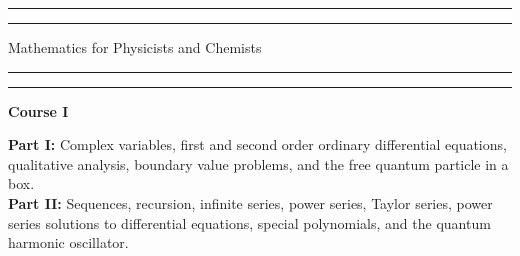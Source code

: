 


\begin{titlepage} %

	\centering %

	\scshape %

	\vspace*{\baselineskip} %


	\rule{\textwidth}{1.6pt}\vspace*{-\baselineskip}\vspace*{2pt} %
	\rule{\textwidth}{0.4pt} %

	\vspace{\baselineskip} %

	{\LARGE Mathematics for Physicists and Chemists} %

	\vspace{0.3\baselineskip} %

	\rule{\textwidth}{0.4pt}\vspace*{-\baselineskip}\vspace{3.2pt} %
	\rule{\textwidth}{1.6pt} %

	\vspace{2\baselineskip} %

	\noindent\textbf{\large{Course I}}

	\noindent\textbf{Part I:} Complex variables, first and second order ordinary differential equations, qualitative analysis, boundary value problems, and the free quantum particle in a box.\\

    \noindent\textbf{Part II:} Sequences, recursion, infinite series, power series, Taylor series, power series solutions to differential equations, special polynomials, and the quantum harmonic oscillator.\\


\end{titlepage}
